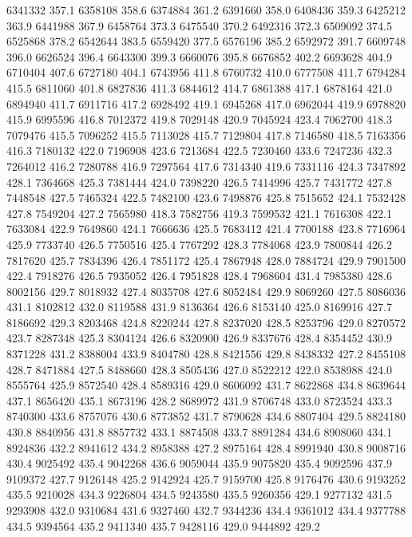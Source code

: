 6341332 357.1
6358108 358.6
6374884 361.2
6391660 358.0
6408436 359.3
6425212 363.9
6441988 367.9
6458764 373.3
6475540 370.2
6492316 372.3
6509092 374.5
6525868 378.2
6542644 383.5
6559420 377.5
6576196 385.2
6592972 391.7
6609748 396.0
6626524 396.4
6643300 399.3
6660076 395.8
6676852 402.2
6693628 404.9
6710404 407.6
6727180 404.1
6743956 411.8
6760732 410.0
6777508 411.7
6794284 415.5
6811060 401.8
6827836 411.3
6844612 414.7
6861388 417.1
6878164 421.0
6894940 411.7
6911716 417.2
6928492 419.1
6945268 417.0
6962044 419.9
6978820 415.9
6995596 416.8
7012372 419.8
7029148 420.9
7045924 423.4
7062700 418.3
7079476 415.5
7096252 415.5
7113028 415.7
7129804 417.8
7146580 418.5
7163356 416.3
7180132 422.0
7196908 423.6
7213684 422.5
7230460 433.6
7247236 432.3
7264012 416.2
7280788 416.9
7297564 417.6
7314340 419.6
7331116 424.3
7347892 428.1
7364668 425.3
7381444 424.0
7398220 426.5
7414996 425.7
7431772 427.8
7448548 427.5
7465324 422.5
7482100 423.6
7498876 425.8
7515652 424.1
7532428 427.8
7549204 427.2
7565980 418.3
7582756 419.3
7599532 421.1
7616308 422.1
7633084 422.9
7649860 424.1
7666636 425.5
7683412 421.4
7700188 423.8
7716964 425.9
7733740 426.5
7750516 425.4
7767292 428.3
7784068 423.9
7800844 426.2
7817620 425.7
7834396 426.4
7851172 425.4
7867948 428.0
7884724 429.9
7901500 422.4
7918276 426.5
7935052 426.4
7951828 428.4
7968604 431.4
7985380 428.6
8002156 429.7
8018932 427.4
8035708 427.6
8052484 429.9
8069260 427.5
8086036 431.1
8102812 432.0
8119588 431.9
8136364 426.6
8153140 425.0
8169916 427.7
8186692 429.3
8203468 424.8
8220244 427.8
8237020 428.5
8253796 429.0
8270572 423.7
8287348 425.3
8304124 426.6
8320900 426.9
8337676 428.4
8354452 430.9
8371228 431.2
8388004 433.9
8404780 428.8
8421556 429.8
8438332 427.2
8455108 428.7
8471884 427.5
8488660 428.3
8505436 427.0
8522212 422.0
8538988 424.0
8555764 425.9
8572540 428.4
8589316 429.0
8606092 431.7
8622868 434.8
8639644 437.1
8656420 435.1
8673196 428.2
8689972 431.9
8706748 433.0
8723524 433.3
8740300 433.6
8757076 430.6
8773852 431.7
8790628 434.6
8807404 429.5
8824180 430.8
8840956 431.8
8857732 433.1
8874508 433.7
8891284 434.6
8908060 434.1
8924836 432.2
8941612 434.2
8958388 427.2
8975164 428.4
8991940 430.8
9008716 430.4
9025492 435.4
9042268 436.6
9059044 435.9
9075820 435.4
9092596 437.9
9109372 427.7
9126148 425.2
9142924 425.7
9159700 425.8
9176476 430.6
9193252 435.5
9210028 434.3
9226804 434.5
9243580 435.5
9260356 429.1
9277132 431.5
9293908 432.0
9310684 431.6
9327460 432.7
9344236 434.4
9361012 434.4
9377788 434.5
9394564 435.2
9411340 435.7
9428116 429.0
9444892 429.2
